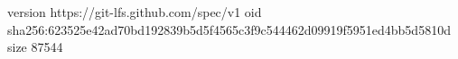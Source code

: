 version https://git-lfs.github.com/spec/v1
oid sha256:623525e42ad70bd192839b5d5f4565c3f9c544462d09919f5951ed4bb5d5810d
size 87544
